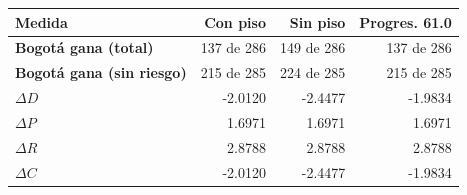 \renewcommand{\arraystretch}{1.2}
\begin{tabular}{|l|r|r|r|}
\hline
\rowcolor{gray!20} \textbf{Medida} & \textbf{Con piso} & \textbf{Sin piso} & \textbf{Progres. 61.0} \\
\hline
\textbf{Bogotá gana (total)} & 137 de 286 & 149 de 286 & 137 de 286 \\
\hline
\textbf{Bogotá gana (sin riesgo)} & 215 de 285 & 224 de 285 & 215 de 285 \\
\hline
\textbf{$\Delta D$} & -2.0120 & -2.4477 & -1.9834 \\
\hline
\textbf{$\Delta P$} & 1.6971 & 1.6971 & 1.6971 \\
\hline
\textbf{$\Delta R$} & 2.8788 & 2.8788 & 2.8788 \\
\hline
\textbf{$\Delta C$} & -2.0120 & -2.4477 & -1.9834 \\
\hline
\end{tabular}
